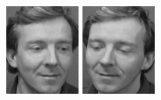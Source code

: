 \begin{figure}[ht]
 \includegraphics[width=\columnwidth/11]{ch3/figures/s3_3.png}
 \includegraphics[width=\columnwidth/11]{ch3/figures/s3_4.png}

\end{figure}
